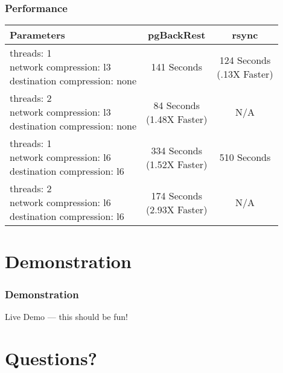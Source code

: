 \documentclass[hyperref={pdfpagelabels=false}]{beamer}
\begin{document}
    \begin{frame}
        \frametitle{Performance}

        \begin{table}
            \begin{tabular}{l || c | c}
                Parameters & pgBackRest & rsync \\
                \hline \hline
                \pbox{14em}{threads: 1 \\ network compression: l3 \\ destination compression: none} &
                    141 Seconds &
                    \pbox{14em}{124 Seconds \\ (.13X Faster)} \\ \hline
                \pbox{14em}{threads: 2 \\ network compression: l3 \\ destination compression: none} &
                    \pbox{14em}{84 Seconds \\ (1.48X Faster)} &
                    N/A \\ \hline
                \pbox{14em}{threads: 1 \\ network compression: l6 \\ destination compression: l6} &
                    \pbox{14em}{334 Seconds \\ (1.52X Faster)} &
                    510 Seconds \\ \hline
                \pbox{14em}{threads: 2 \\ network compression: l6 \\ destination compression: l6} &
                    \pbox{14em}{174 Seconds \\ (2.93X Faster)} &
                    N/A
            \end{tabular}
        \end{table}

    \end{frame}

    \section{Demonstration}

    \begin{frame}
        \frametitle{Demonstration}

        Live Demo --- this should be fun!
    \end{frame}

    \section{Questions?}
\end{document}
